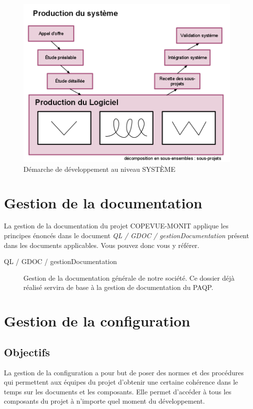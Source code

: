 \documentclass{mise_en_page}
\begin{document}
\begin{figure}[H]
	\centering
	\includegraphics[width=150mm]{DEMARCHE.png}
	\caption{\label{DEMARCHE} Démarche de développement au niveau SYSTÈME}
\end{figure}

\section{Gestion de la documentation}

La gestion de la documentation du projet COPEVUE-MONIT applique les principes énoncés dans le document \emph{QL / GDOC / gestionDocumentation} présent dans les documents applicables. Vous pouvez donc vous y référer.

\begin{description}
	\item[QL / GDOC / gestionDocumentation] Gestion de la documentation générale de notre société. Ce dossier déjà réalisé servira de base à la gestion de documentation du PAQP.
\end{description}

\section{Gestion de la configuration}

\subsection{Objectifs}

La gestion de la configuration a pour but de poser des normes et des procédures qui permettent aux équipes du projet d'obtenir une certaine cohérence dans le temps sur les documents et les composants. Elle permet d'accéder à tous les composants du projet à n'importe quel moment du développement.
\end{document}

